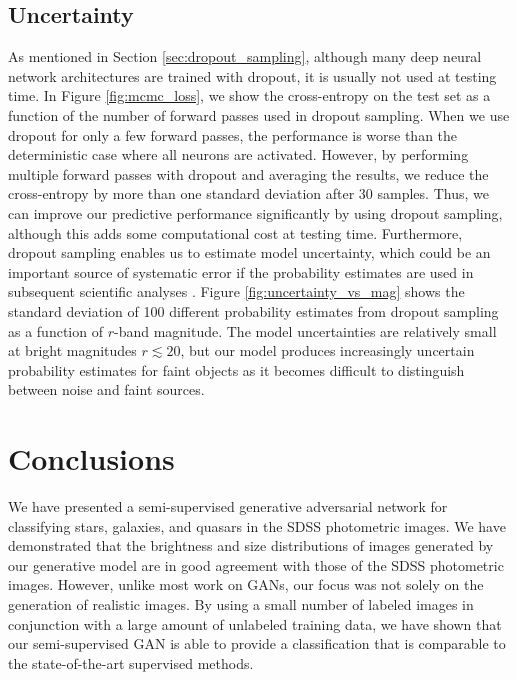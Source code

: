 \subsection{Uncertainty}
As mentioned in Section \ref{sec:dropout_sampling}, although many deep neural network architectures are trained with dropout,
it is usually not used at testing time.
In Figure \ref{fig:mcmc_loss}, we show the cross-entropy on the test set as a function of the number of forward passes
used in dropout sampling.
When we use dropout for only a few forward passes, the performance is worse than the deterministic case where all neurons are activated.
However, by performing multiple forward passes with dropout and averaging the results, we reduce the cross-entropy by more than one
standard deviation after 30 samples.
Thus, we can improve our predictive performance significantly by using dropout sampling, although this adds some computational cost
at testing time.
Furthermore, dropout sampling enables us to estimate model uncertainty, which could be an important source of systematic error
if the probability estimates are used in subsequent scientific analyses \citep{ross2011ameliorating}.
Figure \ref{fig:uncertainty_vs_mag} shows the standard deviation of 100 different probability estimates from dropout sampling
as a function of $r$-band magnitude.
The model uncertainties are relatively small at bright magnitudes $r \lesssim 20$, but our model produces increasingly uncertain
probability estimates for faint objects as it becomes difficult to distinguish between noise and faint sources.

\section{Conclusions}
  \label{sec:conclusions}

We have presented a semi-supervised generative adversarial network for classifying stars, galaxies, and quasars in the SDSS photometric images.
We have demonstrated that the brightness and size distributions of images generated by our generative model
are in good agreement with those of the SDSS photometric images.
However, unlike most work on GANs, our focus was not solely on the generation of realistic images.
By using a small number of labeled images in conjunction with a large amount of unlabeled training data,
we have shown that our semi-supervised GAN is able to provide a classification that is comparable to the state-of-the-art
supervised methods.

